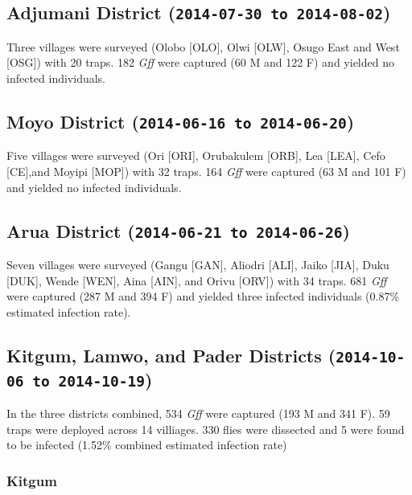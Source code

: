 \documentclass[letterpaper]{report}
\begin{document}
\subsection{Adjumani District
(\texttt{2014-07-30 to 2014-08-02})}\label{adjumani-district-2014-07-30-to-2014-08-02}

Three villages were surveyed (Olobo {[}OLO{]}, Olwi {[}OLW{]}, Osugo
East and West {[}OSG{]}) with 20 traps. 182 \emph{Gff} were captured (60
M and 122 F) and yielded no infected individuals.

\subsection{Moyo District
(\texttt{2014-06-16 to 2014-06-20})}\label{moyo-district-2014-06-16-to-2014-06-20}

Five villages were surveyed (Ori {[}ORI{]}, Orubakulem {[}ORB{]}, Lea
{[}LEA{]}, Cefo {[}CE{]},and Moyipi {[}MOP{]}) with 32 traps. 164
\emph{Gff} were captured (63 M and 101 F) and yielded no infected
individuals.

\subsection{Arua District
(\texttt{2014-06-21 to 2014-06-26})}\label{arua-district-2014-06-21-to-2014-06-26}

Seven villages were surveyed (Gangu {[}GAN{]}, Aliodri {[}ALI{]}, Jaiko
{[}JIA{]}, Duku {[}DUK{]}, Wende {[}WEN{]}, Aina {[}AIN{]}, and Orivu
{[}ORV{]}) with 34 traps. 681 \emph{Gff} were captured (287 M and 394 F)
and yielded three infected individuals (0.87\% estimated infection
rate).

\subsection{Kitgum, Lamwo, and Pader Districts
(\texttt{2014-10-06 to 2014-10-19})}\label{kitgum-lamwo-and-pader-districts-2014-10-06-to-2014-10-19}

In the three districts combined, 534 \emph{Gff} were captured (193 M and
341 F). 59 traps were deployed across 14 villiages. 330 flies were
dissected and 5 were found to be infected (1.52\% combined estimated
infection rate)

\subsubsection{Kitgum}\label{kitgum}
\end{document}
